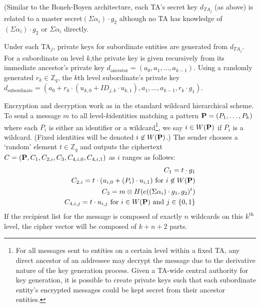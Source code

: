 \documentclass[10pt]{article}
\begin{document}
(Similar to the Boneh-Boyen architecture, each TA’s secret key $d_{TA_j}$ (as above) is related to a master secret$(\Sigma \alpha_i)\cdot g_2$ although no TA has knowledge of $(\Sigma \alpha_i)\cdot g_2$ or $\Sigma \alpha_i$ directly.

Under each TA$_j$, private keys for subordinate entities are generated from $d_{TA_j}$. For a subordinate on level $k$,the private key is given recursively from its immediate ancestor's private key $d_{\text{ancestor}} = (a_0, a_1,\dots, a_{k-1})$. Using a randomly generated $r_k \in \mathbb{Z}_q$, the $k$th level subordinate's private key$d_{\text{subordinate}} = (a_0 + r_k\cdot (u_{k,0} + ID_{j,k}\cdot u_{k,1}), a_1, \dots, a_{k-1}, r_k \cdot g_1)$.

Encryption and decryption work as in the standard wildcard hierarchical scheme. To send a message $m$ to all level-$k$identities matching a pattern ${\bf P} = (P_1, \dots, P_k)$ where each $P_i$ is either an identifier or a wildcard\footnote{For all messages sent to entities on a certain level within a fixed TA, any direct ancestor of an addressee may decrypt the message due to the derivative nature of the key generation process. Given a TA-wide central authority for key generation, it is possible to create private keys such that each subordinate entity's encrypted messages could be kept secret from their ancestor entities.}, we say $i \in W({\bf P})$ if $P_i$ is a wildcard. (Fixed identities will be denoted $i \not\in W({\bf P})$.)  The sender chooses a ‘random’ element $t \in \mathbb{Z}_q$ and outputs the ciphertext $C = ({\bf P}, C_1, C_{2,i}, C_3, C_{4,i,0}, C_{4,i,1})$ as
$i$ ranges as follows:
\begin{align*}
C_1 = t \cdot g_1\\
C_{2,i} = t \cdot (u_{i,0} + (P_i) \cdot u_{i,1})\text{ for }i \not\in W({\bf P})\\
C_3 = m \otimes H(e((\Sigma \alpha_i) \cdot g_1, g_2)^t)\\
C_{4,i,j} = t \cdot u_{i,j}\text{ for }i \in W({\bf P})\text{ and }j \in \{0,1\}
\end{align*}
If the recipient list for the message is composed of exactly $n$ wildcards on this $k^{\textrm{th}}$ level, the cipher vector
will be composed of $k+n+2$ parts.
\end{document}
